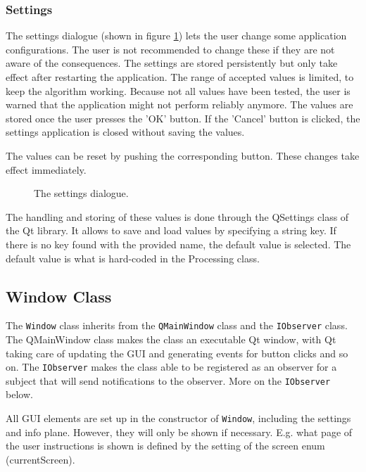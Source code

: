 \subsubsection{Settings}
The settings dialogue (shown in figure \ref{fig:UIsettings}) lets the user change some application configurations. The user is not recommended to change these if they are not aware of the consequences. The settings are stored persistently but only take effect after restarting the application. The range of accepted values is limited, to keep the algorithm working. Because not all values have been tested, the user is warned that the application might not perform reliably anymore. The values are stored once the user presses the 'OK' button. If the 'Cancel' button is clicked, the settings application is closed without saving the values.

The values can be reset by pushing the corresponding button. These changes take effect immediately. 

\begin{figure}[ht]
\centering
\caption{The settings dialogue.}
\label{fig:UIsettings}
\end{figure}

The handling and storing of these values is done through the QSettings class of the Qt library. It allows to save and load values by specifying a string key. If there is no key found with the provided name, the default value is selected. The default value is what is hard-coded in the Processing class.

\subsection{Window Class}
The \texttt{Window} class inherits from the \texttt{QMainWindow} class and the \texttt{IObserver} class. The QMainWindow class makes the class an executable Qt window, with Qt taking care of updating the GUI and generating events for button clicks and so on. The \texttt{IObserver} makes the class able to be registered as an observer for a subject that will send notifications to the observer. More on the \texttt{IObserver} below.

All GUI elements are set up in the constructor of  \texttt{Window}, including the settings and info plane. However, they will only be shown if necessary. E.g. what page of the user instructions is shown is defined by the setting of the screen enum (currentScreen).

